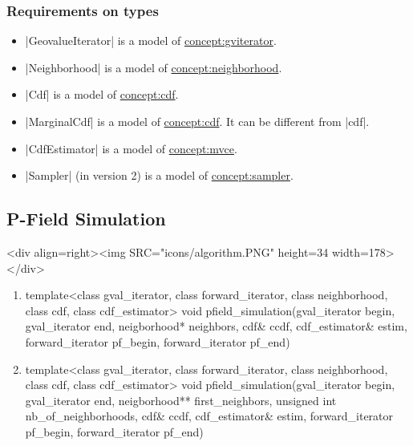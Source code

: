 \documentclass[12pt,twoside]{report}
\begin{document}
\htmlrule[CLEAR=all]  \subsubsection*{Requirements on types}
\begin{itemize}
\item |GeovalueIterator| is a model of \hyperref{Geo-Value Iterator}{Geo-Value Iterator (see Section}{)}{concept:gviterator}.
\item |Neighborhood| is a model of \hyperref{Neighborhood}{Neighborhood (see Section}{)}{concept:neighborhood}. 
\item |Cdf| is a model of \hyperref{CDF}{CDF}{}{concept:cdf}.
\item |MarginalCdf| is a model of \hyperref{CDF}{CDF}{}{concept:cdf}. It can be different from |cdf|.
\item |CdfEstimator| is a model of \hyperref{Multiple Variables Cdf Estimator}{Multiple Variables Cdf Estimator (see Section}{)}{concept:mvce}.
\item |Sampler| (in version 2) is a model of \hyperref{Sampler}{Sampler (see Section}{)}{concept:sampler}.
\end{itemize}




 




\subsection{P-Field Simulation}
\begin{htmlonly}
<div align=right><img SRC="icons/algorithm.PNG" height=34 width=178></div>
\end{htmlonly}


\begin{enumerate}
\item 
\begin{code}
template<class gval_iterator, class forward_iterator,
         class neighborhood, class cdf, class cdf_estimator>
void
pfield_simulation(gval_iterator begin, gval_iterator end,
                  neigborhood* neighbors,
                  cdf& ccdf, cdf_estimator& estim,
                  forward_iterator pf_begin, forward_iterator pf_end) 
\end{code}

\item 
\begin{code}
template<class gval_iterator, class forward_iterator,
         class neighborhood, class cdf, class cdf_estimator>
void
pfield_simulation(gval_iterator begin, gval_iterator end,
                  neigborhood** first_neighbors,
                  unsigned int nb_of_neighborhoods,
                  cdf& ccdf, cdf_estimator& estim,
                  forward_iterator pf_begin, forward_iterator pf_end) 

\end{code}

\end{enumerate}
\end{document}
